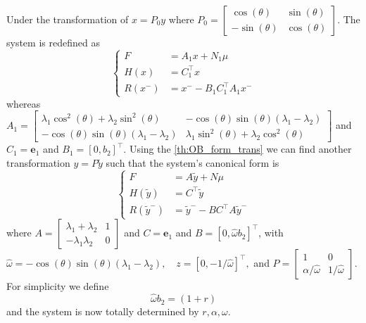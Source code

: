 \documentclass{article}
\begin{document}
Under the transformation of $x = P_0 y$ where 
$
P_0 = \begin{bmatrix}
	\cos(\theta)   &  \sin(\theta) \\
	- \sin(\theta) &  \cos(\theta)  
\end{bmatrix}
$.
The system is redefined as 
\begin{equation}
	\begin{cases}
		F  & = A_1 x + N_1 \mu
		\\
		H(x) & = C_1^{\top}x  
		\\
		R(x^-) & = x^- - B_1 C_1^{\top} A_1x^-
	\end{cases}
\end{equation}
whereas 
$
A_1 = \begin{bmatrix}
	\lambda_1 \cos^2(\theta) +  \lambda_2 \sin^2(\theta) & - \cos(\theta) \sin(\theta) (\lambda_1 - \lambda_2)
	\\
	- \cos(\theta) \sin(\theta) (\lambda_1 - \lambda_2) & \lambda_1 \sin^2(\theta) +  \lambda_2 \cos^2(\theta)
\end{bmatrix}
$
and 
$
C_1 = \mathbf{e}_1
$
and 
$
B_1 = [0,b_2]^{\top}
$.
Using the \cref{th:OB_form_trans} we can find another transformation $y = P \tilde{y}$ such that the system's canonical form is 
\begin{equation}
	\begin{cases}
		F  & = A \tilde{y} + N \mu
		\\
		H(\tilde{y})  & = C^{\top} \tilde{y} 
		\\
		R(\tilde{y}^-) & = \tilde{y}^- - B C^{\top}A\tilde{y}^-
	\end{cases}
	\label{eq:OB_canonical_form_2D}
\end{equation}
where 
$
A = \begin{bmatrix}
	\lambda_1 + \lambda_2 & 1
	\\
	-\lambda_1 \lambda_2 & 0
\end{bmatrix}
$
and 
$
C = \mathbf{e}_1
$
and 
$
B = [0,  \hat{\omega} b_2]^{\top}
$, 
with 
$
\hat{\omega} = - \cos(\theta) \sin(\theta) (\lambda_1 - \lambda_2), \quad z = [0, -1/\hat{\omega}]^{\top},
$
and
$
P = \begin{bmatrix}
	1 & 0 
	\\
	\alpha/\hat{\omega} & 1/\hat{\omega}
\end{bmatrix}
$. For simplicity we define 
\[
\hat{\omega} b_2 = (1 + r) 
\] 
and the system is now totally determined by $r, \alpha, \omega$.
\end{document}

